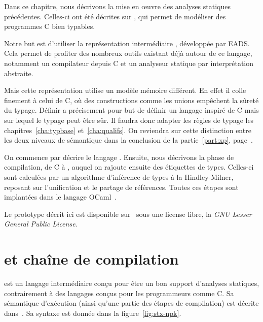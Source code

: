 Dans ce chapitre, nous décrivons la mise en œuvre des analyses statiques
précédentes.
Celles-ci ont été décrites sur \langname, qui permet de modéliser des programmes
C bien typables.

Notre but est d'utiliser la représentation intermédiaire \newspeak, développée
par EADS. Cela permet de profiter des nombreux outils existant déjà autour de ce
langage, notamment un compilateur depuis C et un analyseur statique par
interprétation abstraite.

Mais cette représentation utilise un modèle mémoire différent. En effet il
colle finement à celui de C, où des constructions comme les unions empêchent la
sûreté du typage. Définir \langname a précisement pour but de définir un langage
inspiré de C mais sur lequel le typage peut être sûr. Il faudra donc adapter les
règles de typage les chapitres~\ref{cha:typbase} et~\ref{cha:qualifs}. On
reviendra sur cette distinction entre les deux niveaux de sémantique dans la
conclusion de la partie~\ref{part:xp}, page~\pageref{page:ccl-npk-spk}.

On commence par décrire le langage \newspeak. Ensuite, nous décrivons la phase
de compilation, de C à \newspeak, auquel on rajoute ensuite des étiquettes de
types. Celles-ci sont calculées par un algorithme d'inférence de types à la
Hindley-Milner, reposant sur l'unification et le partage de références. Toutes
ces étapes sont implantées dans le langage OCaml~\cite{DAOC}.

Le prototype décrit ici est disponible sur~ sous une license
libre, la \emph{GNU Lesser General Public License}.

\section{\newspeak et chaîne de compilation}
\label{sec:compil}

\newspeak est un langage intermédiaire conçu pour être un bon support d'analyses
statiques, contrairement à des langages conçus pour les programmeurs comme C. Sa
sémantique d'exécution (ainsi qu'une partie des étapes de compilation)
est décrite dans~\cite{newspeak}. Sa syntaxe est donnée dans la
figure~\ref{fig:stx-npk}.

